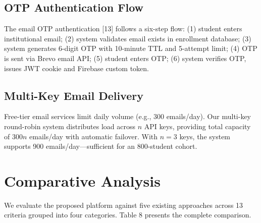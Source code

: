 \documentclass[12pt,a4paper]{article}
\begin{document}
\subsection{OTP Authentication Flow}

The email OTP authentication [13] follows a six-step flow: (1) student enters institutional email; (2) system validates email exists in enrollment database; (3) system generates 6-digit OTP with 10-minute TTL and 5-attempt limit; (4) OTP is sent via Brevo email API; (5) student enters OTP; (6) system verifies OTP, issues JWT cookie and Firebase custom token.

\subsection{Multi-Key Email Delivery}

Free-tier email services limit daily volume (e.g., 300 emails/day). Our multi-key round-robin system distributes load across $n$ API keys, providing total capacity of $300n$ emails/day with automatic failover. With $n = 3$ keys, the system supports 900 emails/day---sufficient for an 800-student cohort.

\section{Comparative Analysis}

We evaluate the proposed platform against five existing approaches across 13 criteria grouped into four categories. Table 8 presents the complete comparison.
\end{document}
